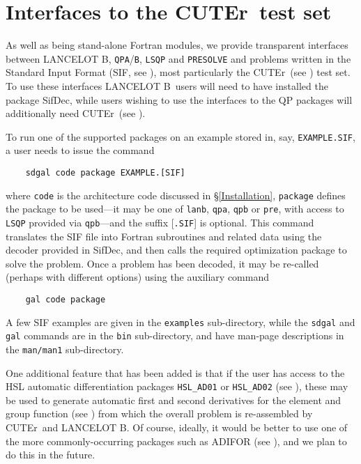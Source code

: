 \documentclass[twoside]{article}
\newcommand{\lanb}{{\sf LANCELOT B}}
\newcommand{\cuter}{{\sf CUTEr}}
\newcommand{\sifdec}{{\sf SifDec}}
\begin{document}
\section{Interfaces to the \cuter\ test set}

As well as being stand-alone Fortran modules, we provide transparent 
interfaces between \lanb, {\tt QPA}/{\tt B}, {\tt LSQP} and {\tt PRESOLVE} and
problems written in the Standard Input Format (SIF, see
), most particularly
the \cuter\ (see ) test set. To use these
interfaces \lanb\ users will need to have installed the package 
\sifdec, while users wishing to use the interfaces to the QP packages 
will additionally need \cuter\ (see ). 

To run one of the supported packages on an example stored in, say, 
{\tt EXAMPLE.SIF}, a user needs to issue the command
\begin{verbatim}
    sdgal code package EXAMPLE.[SIF] 
\end{verbatim}
where {\tt code} is the architecture code discussed in \S\ref{Installation},
{\tt package} defines the package to be used---it may be one of {\tt lanb},
{\tt qpa}, {\tt qpb} or {\tt pre}, with access to {\tt LSQP} 
provided via {\tt qpb}---and the suffix [{\tt .SIF}] is optional.
This command translates the SIF file into Fortran subroutines and 
related data using the decoder provided in \sifdec, and then calls
the required optimization package to solve the problem. Once a problem
has been decoded, it may be re-called (perhaps with different options)
using the auxiliary command
\begin{verbatim}
    gal code package 
\end{verbatim}
A few SIF examples are given in the {\tt examples} sub-directory, while the
{\tt sdgal} and {\tt gal} commands are in the {\tt bin} sub-directory, and
have man-page descriptions in the {\tt man/man1} sub-directory.

One additional feature that has been added is that if the user has
access to the HSL automatic differentiation packages {\tt HSL\_AD01} 
or {\tt HSL\_AD02} (see ), 
these may be used to generate automatic first and second derivatives
for the element and group function (see ) 
from which the overall problem is re-assembled by \cuter\ and \lanb.
Of course, ideally, it would be better to use one of the more 
commonly-occurring packages 
such as  ADIFOR (see ),
and we plan to do this in the future.
\end{document}
